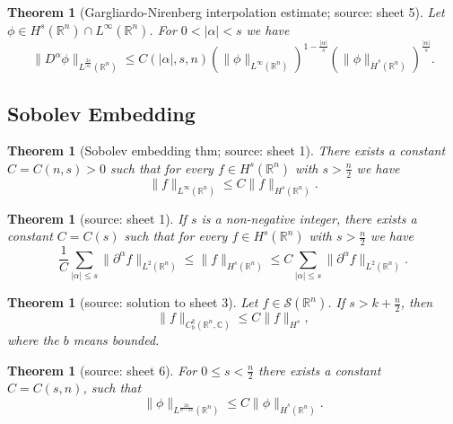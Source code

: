 \documentclass[12pt,a4paper]{article}
\newtheorem{thm}[definition]{Theorem}
\newcommand{\Rn}{\mathbb{R}^n}
\begin{document}
\begin{thm}[Gargliardo-Nirenberg interpolation estimate; source: sheet 5]
Let $\phi \in H^s(\Rn)\cap L^{\infty}(\Rn)$. For $0<\vert \alpha \vert < s$ we have
\begin{equation}
\lVert D^{\alpha} \phi \rVert_{L^{\frac{2s}{\vert \alpha \vert}}(\Rn)} \leq C(\vert \alpha \vert,s,n)(\lVert \phi \rVert_{L^{\infty}(\Rn)})^{1-\frac{\vert \alpha \vert}{s}}(\lVert \phi \rVert _{\dot H^s(\Rn)})^{\frac{\vert \alpha \vert}{s}}.
\end{equation}
\end{thm}

\subsection{Sobolev Embedding}

\begin{thm}[Sobolev embedding thm; source: sheet 1]
There exists a constant $C=C(n,s)>0$ such that for every $f\in H^s(\mathbb{R}^n)$ with $s>\frac{n}{2}$ we have
\begin{equation}
\lVert f \rVert_{L^{\infty}(\mathbb{R}^n)} \leq C \lVert f \rVert _{H^s(\mathbb{R}^n)}.
\end{equation}
\end{thm}

\begin{thm}[source: sheet 1]
If $s$ is a non-negative integer, there exists a constant $C=C(s)$ such that for every $f\in H^s(\mathbb{R}^n)$ with $s>\frac{n}{2}$ we have
\begin{equation}
\frac{1}{C} \sum_{\lvert\alpha\rvert\leq s} \lVert \partial ^{\alpha} f \rVert_{L^2(\mathbb{R}^n)} \leq \lVert f \rVert _{H^s(\mathbb{R}^n)} \leq C \sum_{\lvert\alpha\rvert\leq s} \lVert \partial ^{\alpha} f \rVert_{L^2(\mathbb{R}^n)}.
\end{equation}
\end{thm}

\begin{thm}[source: solution to sheet 3]
Let $f \in \mathcal{S}(\mathbb{R}^n)$. If $s>k+\frac{n}{2}$, then
\begin{equation}
\lVert f \rVert_{C_b^k(\Rn,\mathbb{C})}\leq C \lVert f \rVert_{H^s},
\end{equation}
where the $b$ means bounded.
\end{thm}

\begin{thm}[source: sheet 6]
For $0\leq s<\frac{n}{2}$ there exists a constant $C=C(s,n)$, such that
\begin{equation}
\lVert \phi \rVert_{L^{\frac{2n}{n-2s}}(\Rn)} \leq C\lVert \phi \rVert_{\dot H^s(\Rn)}.
\end{equation}
\end{thm}
\end{document}

